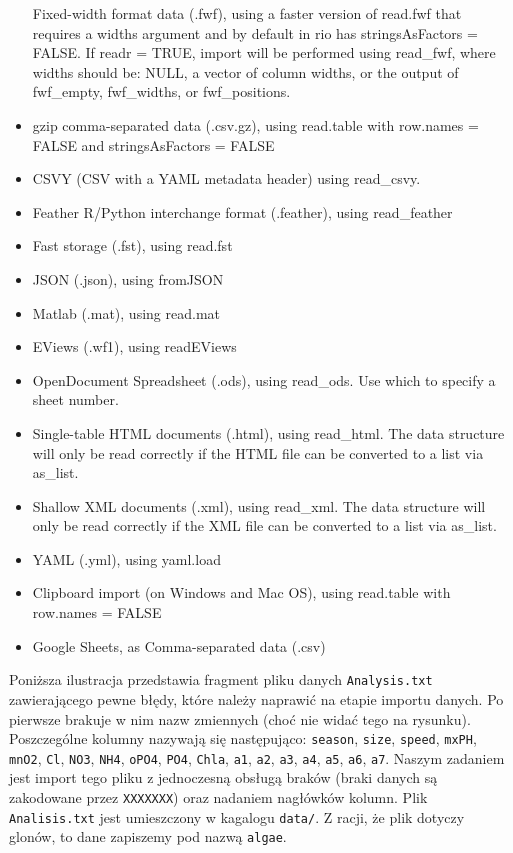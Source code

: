 \documentclass[
]{book}
\theoremstyle{plain}
\theoremstyle{definition}
\theoremstyle{definition}
\theoremstyle{definition}
\theoremstyle{definition}
\theoremstyle{remark}
\let\BeginKnitrBlock\begin \let\EndKnitrBlock\end
\begin{document}
\begin{itemize}
  Fixed-width format data (.fwf), using a faster version of read.fwf that requires a widths argument and by default in rio has stringsAsFactors = FALSE. If readr = TRUE, import will be performed using read\_fwf, where widths should be: NULL, a vector of column widths, or the output of fwf\_empty, fwf\_widths, or fwf\_positions.
\item
  gzip comma-separated data (.csv.gz), using read.table with row.names = FALSE and stringsAsFactors = FALSE
\item
  CSVY (CSV with a YAML metadata header) using read\_csvy.
\item
  Feather R/Python interchange format (.feather), using read\_feather
\item
  Fast storage (.fst), using read.fst
\item
  JSON (.json), using fromJSON
\item
  Matlab (.mat), using read.mat
\item
  EViews (.wf1), using readEViews
\item
  OpenDocument Spreadsheet (.ods), using read\_ods. Use which to specify a sheet number.
\item
  Single-table HTML documents (.html), using read\_html. The data structure will only be read correctly if the HTML file can be converted to a list via as\_list.
\item
  Shallow XML documents (.xml), using read\_xml. The data structure will only be read correctly if the XML file can be converted to a list via as\_list.
\item
  YAML (.yml), using yaml.load
\item
  Clipboard import (on Windows and Mac OS), using read.table with row.names = FALSE
\item
  Google Sheets, as Comma-separated data (.csv)
\end{itemize}

\BeginKnitrBlock{example}
\protect\hypertarget{exm:przyk1}{}{\label{exm:przyk1} }Poniższa ilustracja przedstawia fragment pliku danych \texttt{Analysis.txt} zawierającego pewne błędy, które należy naprawić na etapie importu danych. Po pierwsze brakuje w nim nazw zmiennych (choć nie widać tego na rysunku). Poszczególne kolumny nazywają się następująco: \texttt{season}, \texttt{size}, \texttt{speed}, \texttt{mxPH}, \texttt{mnO2}, \texttt{Cl}, \texttt{NO3}, \texttt{NH4}, \texttt{oPO4}, \texttt{PO4}, \texttt{Chla}, \texttt{a1}, \texttt{a2}, \texttt{a3}, \texttt{a4}, \texttt{a5}, \texttt{a6}, \texttt{a7}. Naszym zadaniem jest import tego pliku z jednoczesną obsługą braków (braki danych są zakodowane przez \texttt{XXXXXXX}) oraz nadaniem nagłówków kolumn. Plik \texttt{Analisis.txt} jest umieszczony w kagalogu \texttt{data/}. Z racji, że plik dotyczy glonów, to dane zapiszemy pod nazwą \texttt{algae}.
\EndKnitrBlock{example}
\end{document}
